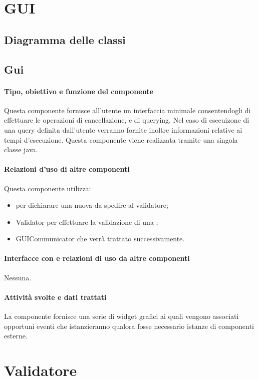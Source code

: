\documentclass[11pt,titlepage,a4paper]{report}
\begin{document}
\section{GUI}
\subsection{Diagramma delle classi}
\subsection{Gui}
\paragraph{Tipo, obiettivo e funzione del componente}
Questa componente fornisce all'utente un interfaccia minimale consentendogli di effettuare le operazioni di cancellazione, e di querying.
Nel caso di esecuizone di una query definita dall'utente verranno fornite inoltre informazioni relative ai tempi d'esecuzione.
Questa componente viene realizzata tramite una singola classe java.
\paragraph{Relazioni d'uso di altre componenti}
Questa componente utilizza:
\begin{itemize}
 \item \BR per dichiarare una nuova \br da spedire al validatore;
 \item Validator per effettuare la validazione di una \br;
 \item GUICommunicator che verr\`a trattato successivamente.
\end{itemize}
\paragraph{Interfacce con e relazioni di uso da altre componenti}
Nessuna.
\paragraph{Attivit\`a svolte e dati trattati}
La componente fornisce una serie di widget grafici ai quali vengono associati opportuni eventi che istanzieranno qualora fosse necessario istanze di componenti esterne.%

\section{Validatore}
\end{document}
